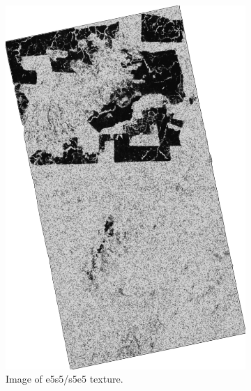 \begin{figure}[H]
\begin{subfigure}[b]{0.4\linewidth}
    \includegraphics[width=\linewidth]{Chapter4/laws_textures/e5s5_s5e5image.png}
     \caption{Image of e5s5/s5e5 texture.}
  \end{subfigure}
  \centering
  \begin{subfigure}[b]{0.4\linewidth}

\end{subfigure}
\end{figure}
